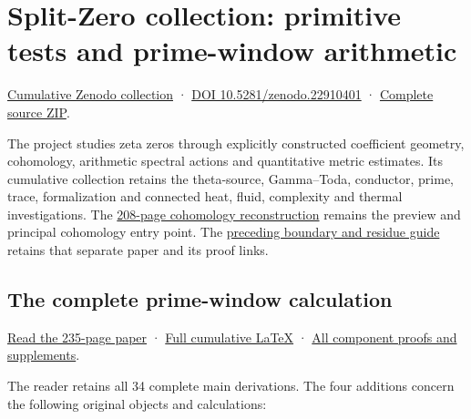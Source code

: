 \documentclass[
]{article}
\author{}
\date{}
\begin{document}
\section{Split-Zero collection: primitive tests and prime-window
arithmetic}\label{split-zero-collection-primitive-tests-and-prime-window-arithmetic}

\href{https://zenodo.org/records/22910401}{Cumulative Zenodo collection}
· \href{https://doi.org/10.5281/zenodo.22910401}{DOI
10.5281/zenodo.22910401} ·
\href{https://zenodo.org/records/22910401/files/170-splitzero-prime-window-complete-sources.zip?download=1}{Complete
source ZIP}.

The project studies zeta zeros through explicitly constructed
coefficient geometry, cohomology, arithmetic spectral actions and
quantitative metric estimates. Its cumulative collection retains the
theta-source, Gamma--Toda, conductor, prime, trace, formalization and
connected heat, fluid, complexity and thermal investigations. The
\href{https://zenodo.org/records/22910401/files/154-splitzero-full-support-graph-pulses.pdf?download=1}{208-page
cohomology reconstruction} remains the preview and principal cohomology
entry point. The
\href{https://github.com/KokunoYumeto/zeta-function-research-reader/blob/8fea210da131ef7714e54eea6becc876c4a55320/workbenches/splitzero-tandem/continuations/20260923-boundary-residue-publication/README.md}{preceding
boundary and residue guide} retains that separate paper and its proof
links.

\subsection{The complete prime-window
calculation}\label{the-complete-prime-window-calculation}

\href{https://zenodo.org/records/22910401/files/169-splitzero-primitive-prime-window-reader.pdf?download=1}{Read
the 235-page paper} ·
\href{https://github.com/KokunoYumeto/zeta-function-research-reader/blob/84edd11df011c3e161a57dad9f083276a3c0bb95/workbenches/splitzero-tandem/branches/tau-zero-prime-positivity/TAU_ZERO_PRIME_POSITIVITY.tex}{Full
cumulative LaTeX} ·
\href{https://github.com/KokunoYumeto/zeta-function-research-reader/blob/84edd11df011c3e161a57dad9f083276a3c0bb95/workbenches/splitzero-tandem/branches/tau-zero-prime-positivity/PUBLICATION_COMPANION.md}{All
component proofs and supplements}.

The reader retains all 34 complete main derivations. The four additions
concern the following original objects and calculations:
\end{document}
